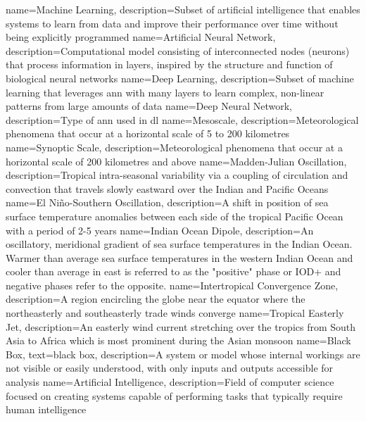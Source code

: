 {
    name=Machine Learning,
    description={Subset of artificial intelligence that enables systems to learn from data and improve their performance over time without being explicitly programmed}
}
{
    name=Artificial Neural Network,
    description={Computational model consisting of interconnected nodes (neurons) that process information in layers, inspired by the structure and function of biological neural networks}
}
{
    name=Deep Learning,
    description={Subset of machine learning that leverages \acrfull{ann} with many layers to learn complex, non-linear patterns from large amounts of data}
}
{
    name=Deep Neural Network,
    description={Type of \acrfull{ann} used in \acrfull{dl}}
}
{
    name=Mesoscale,
    description={Meteorological phenomena that occur at a horizontal scale of 5 to 200 kilometres}
}
{
    name=Synoptic Scale,
    description={Meteorological phenomena that occur at a horizontal scale of 200 kilometres and above}
}
{
    name=Madden-Julian Oscillation,
    description={Tropical intra-seasonal variability via a coupling of circulation and convection that travels slowly eastward over the Indian and Pacific Oceans}
}
{
    name=El Niño-Southern Oscillation,
    description={A shift in position of sea surface temperature anomalies between each side of the tropical Pacific Ocean with a period of 2-5 years}
}
{
    name=Indian Ocean Dipole,
    description={An oscillatory, meridional gradient of sea surface temperatures in the Indian Ocean. Warmer than average sea surface temperatures in the western Indian Ocean and cooler than average in east is referred to as the "positive" phase or IOD+ and negative phases refer to the opposite.}
}
{
    name=Intertropical Convergence Zone,
    description={A region encircling the globe near the equator where the northeasterly and southeasterly trade winds converge}
}
{
    name=Tropical Easterly Jet,
    description={An easterly wind current stretching over the tropics from South Asia to Africa which is most prominent during the Asian monsoon}
}
{
    name=Black Box,
    text={black box},
    description={A system or model whose internal workings are not visible or easily understood, with only inputs and outputs accessible for analysis}
}
{
    name=Artificial Intelligence,
    description={Field of computer science focused on creating systems capable of performing tasks that typically require human intelligence}
}


